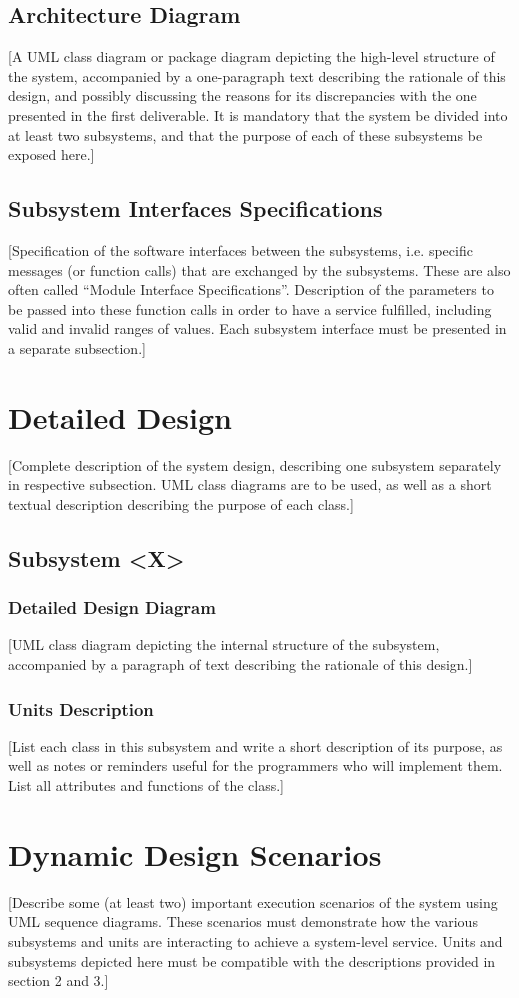 \documentclass[12pt]{article}
\begin{document}
\subsection{Architecture Diagram}
[A UML class diagram or package diagram depicting the high-level structure of the system, accompanied by a one-paragraph text describing the rationale of this design, and possibly discussing the reasons for its discrepancies with the one presented in the first deliverable. It is mandatory that the system be divided into at least two subsystems, and that the purpose of each of these subsystems be exposed here.]

\subsection{Subsystem Interfaces Specifications}
[Specification of the software interfaces between the subsystems, i.e. specific messages (or function calls) that are exchanged by the subsystems. These are also often called “Module Interface Specifications”. Description of the parameters to be passed into these function calls in order to have a service fulfilled, including valid and invalid ranges of values. Each subsystem interface must be presented in a separate subsection.]  

\section{Detailed Design}
[Complete description of the system design, describing one subsystem separately in respective subsection. UML class diagrams are to be used, as well as a short textual description describing the purpose of each class.]  

\subsection{Subsystem \textless X\textgreater}
\subsubsection{Detailed Design Diagram}
[UML class diagram depicting the internal structure of the subsystem, accompanied by a paragraph of text describing the rationale of this design.]

\subsubsection{Units Description}
[List each class in this subsystem and write a short description of its purpose, as well as notes or reminders useful for the programmers who will implement them. List all attributes and functions of the class.]  

\section{Dynamic Design Scenarios}
[Describe some (at least two) important execution scenarios of the system using UML sequence diagrams. These scenarios must demonstrate how the various subsystems and units are interacting to achieve a system-level service. Units and subsystems depicted here must be compatible with the descriptions provided in section 2 and 3.]  
\end{document}

